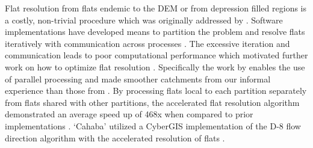 Flat resolution from flats endemic to the DEM or from depression filled regions is a costly, non-trivial procedure which was originally addressed by .  
Software implementations have developed means to partition the problem and resolve flats iteratively with communication across processes \cite{tarboton2009generalized,tesfa2011extraction,wallis2009parallel,tarboton2005terrain}.
The excessive iteration and communication leads to poor computational performance which motivated further work on how to optimize flat resolution \cite{survila2016scalable,barnes2014efficient}.
Specifically the work by  enables the use of parallel processing and made smoother catchments from our informal experience than those from .
By processing flats local to each partition separately from flats shared with other partitions, the accelerated flat resolution algorithm demonstrated an average speed up of 468x when compared to prior implementations \cite{survila2016scalable}.
`Cahaba' utilized a CyberGIS implementation of the D-8 flow direction algorithm with the accelerated resolution of flats \cite{survila2016scalable,cybergis2016}.
%
